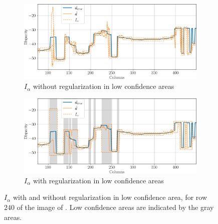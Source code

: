 \begin{figure}
    \centering
    \begin{subfigure}[t]{\linewidth}
        \centering
        \includegraphics[width=\linewidth]{Images/Chap_5/intervals_ambiguous_area_row_240_1.png}
        \caption{$I_\alpha$ without regularization in low confidence areas}
        \label{fig:intervals_ambiguous_row_240_1}
    \end{subfigure}\hfill
    \begin{subfigure}[t]{\linewidth}
        \centering
        \includegraphics[width=\linewidth]{Images/Chap_5/intervals_ambiguous_area_row_240_2.png}
        \caption{$I_\alpha$ with regularization in low confidence areas}
        \label{fig:intervals_ambiguous_row_240_2}
    \end{subfigure}
    \caption{$I_\alpha$ with and without regularization in low confidence area, for row $240$ of the image of . Low confidence areas are indicated by the gray areas.}
    \label{fig:intervals_ambiguous_row_240}
\end{figure}

